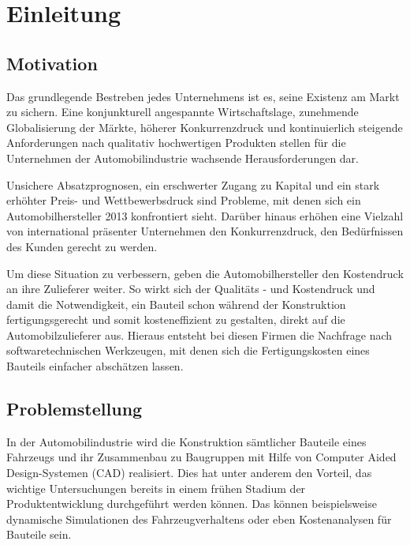 
\chapter{Einleitung}
\label{cha:Einleitung}

\section{Motivation}

Das grundlegende Bestreben jedes Unternehmens ist es, seine Existenz am Markt zu sichern. Eine konjunkturell angespannte Wirtschaftslage, zunehmende Globalisierung der M\"arkte, h\"oherer Konkurrenzdruck und kontinuierlich steigende Anforderungen nach qualitativ hochwertigen Produkten stellen für die Unternehmen der Automobilindustrie wachsende Herausforderungen dar. 

Unsichere Absatzprognosen, ein erschwerter Zugang zu Kapital und ein stark erh\"ohter Preis- und Wettbewerbsdruck sind Probleme,
mit denen sich ein Automobilhersteller 2013 konfrontiert sieht. Dar\"uber hinaus erh\"ohen eine Vielzahl von international pr\"asenter Unternehmen den Konkurrenzdruck, den Bed\"urfnissen des Kunden gerecht zu werden.

Um diese Situation zu verbessern, geben die Automobilhersteller den Kostendruck an ihre Zulieferer weiter. So wirkt sich der Qualit\"ats - und Kostendruck und damit die Notwendigkeit, ein Bauteil schon w\"ahrend der Konstruktion fertigungsgerecht und somit kosteneffizient zu gestalten, direkt auf die Automobilzulieferer aus. Hieraus entsteht bei diesen Firmen die Nachfrage nach softwaretechnischen Werkzeugen, mit denen sich die Fertigungskosten eines Bauteils einfacher absch\"atzen lassen. 

\section{Problemstellung}

In der Automobilindustrie wird die Konstruktion s\"amtlicher Bauteile eines Fahrzeugs und ihr Zusammenbau zu Baugruppen mit Hilfe von Computer Aided Design-Systemen (CAD) realisiert. Dies hat unter anderem den Vorteil, das wichtige Untersuchungen bereits in einem fr\"uhen Stadium der Produktentwicklung durchgef\"uhrt werden k\"onnen. Das k\"onnen beispielsweise dynamische Simulationen des Fahrzeugverhaltens oder eben Kostenanalysen f\"ur Bauteile sein.

